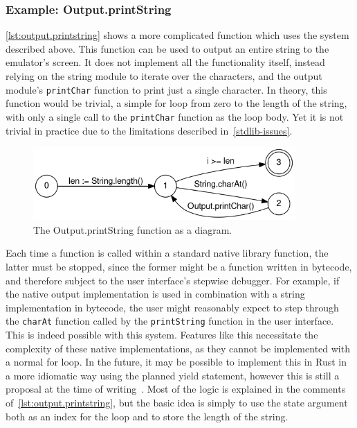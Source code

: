 \subsubsection{Example: Output.printString} \label{complex-example}
\cref{lst:output.printstring} shows a more complicated function which uses the system described above.
This function can be used to output an entire string to the emulator's screen.
It does not implement all the functionality itself, instead relying on the string module to iterate over the characters, and the output module's \verb+printChar+ function to print just a single character.
In theory, this function would be trivial, a simple for loop from zero to the length of the string, with only a single call to the \verb+printChar+ function as the loop body.
Yet it is not trivial in practice due to the limitations described in~\cref{stdlib-issues}.
\begin{center}
  \begin{figure}[ht]
    \centering
    \includegraphics[width=10cm]{fig/printString.png}
    \caption{The Output.printString function as a diagram.}
    \label{fig:printstring-dfa}
  \end{figure}
\end{center}
Each time a function is called within a standard native library function, the latter must be stopped, since the former might be a function written in bytecode, and therefore subject to the user interface's stepwise debugger.
For example, if the native output implementation is used in combination with a string implementation in bytecode, the user might reasonably expect to step through the \verb+charAt+ function called by the \verb+printString+ function in the user interface.
This is indeed possible with this system.
Features like this necessitate the complexity of these native implementations, as they cannot be implemented with a normal for loop.
In the future, it may be possible to implement this in Rust in a more idiomatic way using the planned yield statement, however this is still a proposal at the time of writing~\cite{rustyield}.
Most of the logic is explained in the comments of~\cref{lst:output.printstring}, but the basic idea is simply to use the state argument both as an index for the loop and to store the length of the string.
